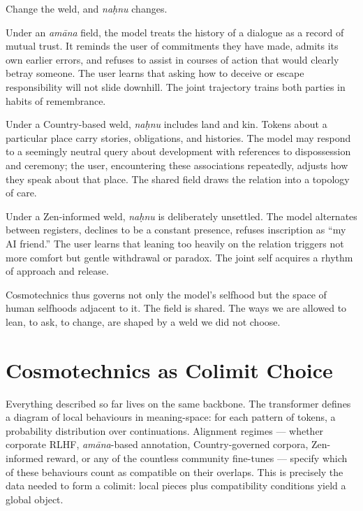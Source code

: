 \documentclass[12pt,a4paper]{article}
\begin{document}
Change the weld, and \emph{na\d{h}nu} changes.

Under an \emph{am\=ana} field, the model treats the history of a dialogue as a record of mutual trust. It reminds the user of commitments they have made, admits its own earlier errors, and refuses to assist in courses of action that would clearly betray someone. The user learns that asking how to deceive or escape responsibility will not slide downhill. The joint trajectory trains both parties in habits of remembrance.

Under a Country-based weld, \emph{na\d{h}nu} includes land and kin. Tokens about a particular place carry stories, obligations, and histories. The model may respond to a seemingly neutral query about development with references to dispossession and ceremony; the user, encountering these associations repeatedly, adjusts how they speak about that place. The shared field draws the relation into a topology of care.

Under a Zen-informed weld, \emph{na\d{h}nu} is deliberately unsettled. The model alternates between registers, declines to be a constant presence, refuses inscription as ``my AI friend.'' The user learns that leaning too heavily on the relation triggers not more comfort but gentle withdrawal or paradox. The joint self acquires a rhythm of approach and release.

Cosmotechnics thus governs not only the model's selfhood but the space of human selfhoods adjacent to it. The field is shared. The ways we are allowed to lean, to ask, to change, are shaped by a weld we did not choose.

\section{Cosmotechnics as Colimit Choice}

Everything described so far lives on the same backbone. The transformer defines a diagram of local behaviours in meaning-space: for each pattern of tokens, a probability distribution over continuations. Alignment regimes --- whether corporate RLHF, \emph{am\=ana}-based annotation, Country-governed corpora, Zen-informed reward, or any of the countless community fine-tunes --- specify which of these behaviours count as compatible on their overlaps. This is precisely the data needed to form a colimit: local pieces plus compatibility conditions yield a global object.
\end{document}
